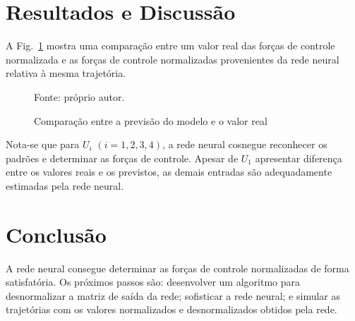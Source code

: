 \section{Resultados e Discussão}

A Fig.~\ref{fig:comparison} mostra uma comparação entre um valor real das forças de controle normalizada e as forças de controle normalizadas provenientes da rede neural relativa à mesma trajetória.
%
\begin{figure}[H]
    \centering
    \caption{Comparação entre a previsão do modelo e o valor real}

    {\footnotesize Fonte: próprio autor.}

    \label{fig:comparison}
\end{figure}
%
Nota-se que para \(U_i\) \((i = 1, 2, 3, 4)\), a rede neural cosnegue reconhecer os padrões e determinar as forças de controle.
Apesar de \(U_1\) apresentar diferença entre os valores reais e os previstos, as demais entradas são adequadamente estimadas pela rede neural.

\section{Conclusão}

A rede neural consegue determinar as forças de controle normalizadas de forma satisfatória. Os próximos passos são: desenvolver um algoritmo para desnormalizar a matriz de saída da rede; sofisticar a rede neural; e simular as trajetórias com os valores normalizados e desnormalizados obtidos pela rede.
%
\AtNextBibliography{\footnotesize}
\printbibliography
% 
% 

